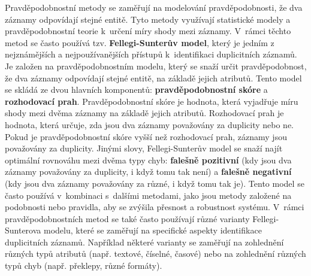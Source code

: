 Pravděpodobnostní metody se zaměřují na modelování pravděpodobnosti, že dva záznamy odpovídají stejné entitě. Tyto metody využívají statistické modely a pravděpodobnostní teorie k~určení míry shody mezi záznamy. V~rámci těchto metod se často používá tzv. \textbf{Fellegi-Sunterův model}, který je jedním z nejznámějších a nejpoužívanějších přístupů k~identifikaci duplicitních záznamů.  Je založen na pravděpodobnostním modelu, který se snaží určit pravděpodobnost, že dva záznamy odpovídají stejné entitě, na základě jejich atributů. Tento model se skládá ze dvou hlavních komponentů: \textbf{pravděpodobnostní skóre} a \textbf{rozhodovací prah}. Pravděpodobnostní skóre je hodnota, která vyjadřuje míru shody mezi dvěma záznamy na základě jejich atributů. Rozhodovací prah je hodnota, která určuje, zda jsou dva záznamy považovány za duplicity nebo ne. Pokud je pravděpodobnostní skóre vyšší než rozhodovací prah, záznamy jsou považovány za duplicity. Jinými slovy, Fellegi-Sunterův model se snaží najít optimální rovnováhu mezi dvěma typy chyb: \textbf{falešně pozitivní} (kdy jsou dva záznamy považovány za duplicity, i když tomu tak není) a \textbf{falešně negativní} (kdy jsou dva záznamy považovány za různé, i když tomu tak je). Tento model se často používá v~kombinaci s~dalšími metodami, jako jsou metody založené na podobnosti nebo pravidla, aby se zvýšila přesnost a robustnost systému.
V~rámci pravděpodobnostních metod se také často používají různé varianty Fellegi-Sunterova modelu, které se zaměřují na specifické aspekty identifikace duplicitních záznamů. Například některé varianty se zaměřují na zohlednění různých typů atributů (např. textové, číselné, časové) nebo na zohlednění různých typů chyb (např. překlepy, různé formáty).



